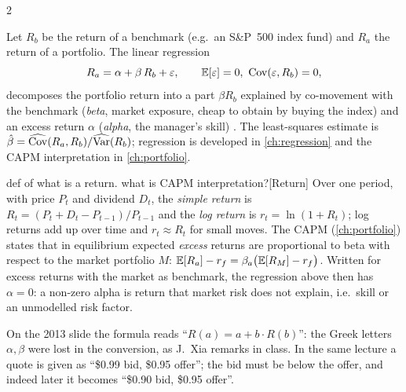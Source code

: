 \begin{paracol}{2}
\begin{definition}\label{def:alphabeta}
Let $R_b$ be the return of a benchmark (e.g.\ an S\&P~500 index fund) and $R_a$ the return of a
portfolio. The linear regression
\[
  R_a = \alpha + \beta\, R_b + \varepsilon, \qquad \mathbb{E}[\varepsilon]=0,\ \operatorname{Cov}(\varepsilon, R_b)=0,
\]
decomposes the portfolio return into a part $\beta R_b$ explained by co-movement with the
benchmark (\emph{beta}, market exposure, cheap to obtain by buying the index) and an excess
return $\alpha$ (\emph{alpha}, the manager's skill) . The least-squares estimate is
$\hat\beta = \widehat{\operatorname{Cov}}(R_a,R_b)/\widehat{\operatorname{Var}}(R_b)$; regression is developed in
\cref{ch:regression} and the CAPM interpretation in \cref{ch:portfolio}.
\end{definition}
\begin{answer}{def of what is a return. what is CAPM interpretation?}[Return]
Over one period, with price $P_t$ and dividend $D_t$, the \emph{simple return} is
$R_t=(P_t+D_t-P_{t-1})/P_{t-1}$ and the \emph{log return} is $r_t=\ln(1+R_t)$; log returns add up
over time and $r_t\approx R_t$ for small moves.
The CAPM (\cref{ch:portfolio}) states that in
equilibrium expected \emph{excess} returns are proportional to beta with respect to the market
portfolio $M$: $\mathbb{E}[R_a]-r_f=\beta_a\bigl(\mathbb{E}[R_M]-r_f\bigr)$. Written for excess returns with the
market as benchmark, the regression above then has $\alpha=0$: a non-zero alpha is return that
market risk does not explain, i.e.\ skill or an unmodelled risk factor.
\end{answer}

\begin{coursenote}
On the 2013 slide the formula reads ``$R(a) = a + b \cdot R(b)$'': the Greek letters $\alpha,\beta$
were lost in the conversion, as J.~Xia remarks in class. In the same lecture a quote is given
as ``\$0.99 bid, \$0.95 offer''; the bid must be below the offer, and indeed later it becomes
``\$0.90 bid, \$0.95 offer''.
\end{coursenote}


\end{paracol}
